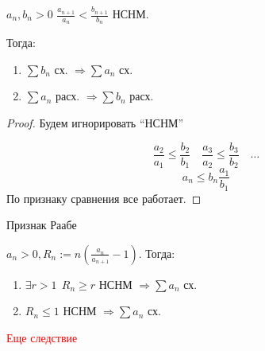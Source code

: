 \begin{lemma}
    $a_n, b_n > 0$ $\frac{a_{n+1}}{a_n} < \frac{b_{n+1}}{b_n}$ НСНМ.

    Тогда:
    \begin{enumerate}
        \item $\sum b_n$ сх. $\Rightarrow \sum a_n$ сх.
        \item $\sum a_n$ расх. $\Rightarrow \sum b_n$ расх.
    \end{enumerate}
\end{lemma}
\begin{proof}
    Будем игнорировать ``НСНМ''

    $$\frac{a_2}{a_1}\leq\frac{b_2}{b_1} \quad \frac{a_3}{a_2} \leq \frac{b_3}{b_2} \quad \ldots$$
    $$a_n\leq b_n \frac{a_1}{b_1}$$
    По признаку сравнения все работает.
\end{proof}

\begin{theorem}
    Признак Раабе

    $a_n > 0, R_n:=n\left( \frac{a_n}{a_{n+1}} - 1 \right)$. Тогда:
    \begin{enumerate}
        \item $\exists r > 1 \ \ R_n\geq r$ НСНМ $\Rightarrow \sum a_n$ сх.
        \item $R_n\leq 1$ НСНМ $\Rightarrow \sum a_n$ сх.
    \end{enumerate}
\end{theorem}

\textcolor{red}{Еще следствие}

